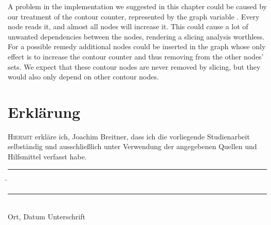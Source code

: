 \documentclass[a4paper,halfparskip,DIV=10,11pt]{scrbook}
\begin{document}
A problem in the implementation we suggested in this chapter could be caused by our treatment of the contour counter, represented by the graph variable . Every node reads it, and almost all nodes will increase it. This could cause a lot of unwanted dependencies between the nodes, rendering a slicing analysis worthless. For a possible remedy additional nodes could be inserted in the graph whose only effect is to increase the contour counter and thus removing  from the other nodes’  sets. We expect that these contour nodes are never removed by slicing, but they would also only depend on other contour nodes.


\appendix

{
\raggedright

}
\chapter*{Erklärung}

\lettrine H{iermit} erkläre ich, Joachim Breitner, dass ich die vorliegende Studienarbeit selb\-ständig
und ausschließlich unter Verwendung der angegebenen Quellen und Hilfsmittel verfasst
habe.
\vspace{20mm}
\begin{tabbing}
\rule{4cm}{.4pt}\hspace{1cm} \= \rule{7cm}{.4pt} \\
Ort, Datum \> Unterschrift
\end{tabbing}
\end{document}
